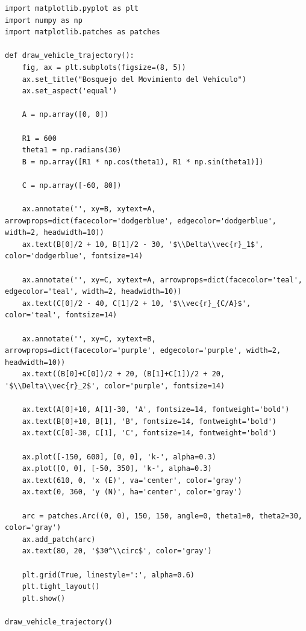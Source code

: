\documentclass[12pt, a4paper]{article}
\begin{document}
\begin{lstlisting}
import matplotlib.pyplot as plt
import numpy as np
import matplotlib.patches as patches

def draw_vehicle_trajectory():
    fig, ax = plt.subplots(figsize=(8, 5))
    ax.set_title("Bosquejo del Movimiento del Vehículo")
    ax.set_aspect('equal')
    
    A = np.array([0, 0])
    
    R1 = 600
    theta1 = np.radians(30) 
    B = np.array([R1 * np.cos(theta1), R1 * np.sin(theta1)])
    
    C = np.array([-60, 80])
    
    ax.annotate('', xy=B, xytext=A, arrowprops=dict(facecolor='dodgerblue', edgecolor='dodgerblue', width=2, headwidth=10))
    ax.text(B[0]/2 + 10, B[1]/2 - 30, '$\\Delta\\vec{r}_1$', color='dodgerblue', fontsize=14)
    
    ax.annotate('', xy=C, xytext=A, arrowprops=dict(facecolor='teal', edgecolor='teal', width=2, headwidth=10))
    ax.text(C[0]/2 - 40, C[1]/2 + 10, '$\\vec{r}_{C/A}$', color='teal', fontsize=14)
    
    ax.annotate('', xy=C, xytext=B, arrowprops=dict(facecolor='purple', edgecolor='purple', width=2, headwidth=10))
    ax.text((B[0]+C[0])/2 + 20, (B[1]+C[1])/2 + 20, '$\\Delta\\vec{r}_2$', color='purple', fontsize=14)
    
    ax.text(A[0]+10, A[1]-30, 'A', fontsize=14, fontweight='bold')
    ax.text(B[0]+10, B[1], 'B', fontsize=14, fontweight='bold')
    ax.text(C[0]-30, C[1], 'C', fontsize=14, fontweight='bold')
    
    ax.plot([-150, 600], [0, 0], 'k-', alpha=0.3)
    ax.plot([0, 0], [-50, 350], 'k-', alpha=0.3)
    ax.text(610, 0, 'x (E)', va='center', color='gray')
    ax.text(0, 360, 'y (N)', ha='center', color='gray')
    
    arc = patches.Arc((0, 0), 150, 150, angle=0, theta1=0, theta2=30, color='gray')
    ax.add_patch(arc)
    ax.text(80, 20, '$30^\\circ$', color='gray')

    plt.grid(True, linestyle=':', alpha=0.6)
    plt.tight_layout()
    plt.show()

draw_vehicle_trajectory()
\end{lstlisting}
\end{document}
